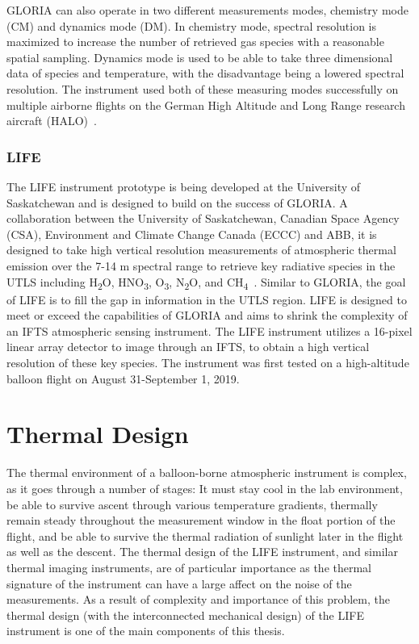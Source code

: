 GLORIA can also operate in two different measurements modes, chemistry mode (CM) and dynamics mode (DM). In chemistry mode, spectral resolution is maximized to increase the number of retrieved gas species with a reasonable spatial sampling. Dynamics mode is used to be able to take three dimensional data of species and temperature, with the disadvantage being a lowered spectral resolution. The instrument used both of these measuring modes successfully on multiple airborne flights on the German High Altitude and Long Range research aircraft (HALO)~\citep{GLORIA_concept}. 

\subsubsection{LIFE} %
The LIFE instrument prototype is being developed at the University of Saskatchewan and is designed to build on the success of GLORIA.  A collaboration between the University of Saskatchewan, Canadian Space Agency (CSA), Environment and Climate Change Canada (ECCC) and ABB, it is designed to take high vertical resolution measurements of atmospheric thermal emission over the 7-14 \textmu m spectral range to retrieve key radiative species in the UTLS including H\textsubscript{2}O, HNO\textsubscript{3}, O\textsubscript{3}, N\textsubscript{2}O, and CH\textsubscript{4}~\citep{ethans_thesis}. Similar to GLORIA, the goal of LIFE is to fill the gap in information in the UTLS region. LIFE is designed to meet or exceed the capabilities of GLORIA and aims to shrink the complexity of an IFTS atmospheric sensing instrument. The LIFE instrument utilizes a 16-pixel linear array detector to image through an IFTS, to obtain a high vertical resolution of these key species. The instrument was first tested on a high-altitude balloon flight on August 31-September 1, 2019.

\section{Thermal Design}
The thermal environment of a balloon-borne atmospheric instrument is complex, as it goes through a number of stages: It must stay cool in the lab environment, be able to survive ascent through various temperature gradients, thermally remain steady throughout the measurement window in the float portion of the flight, and be able to survive the thermal radiation of sunlight later in the flight as well as the descent. The thermal design of the LIFE instrument, and similar thermal imaging instruments, are of particular importance as the thermal signature of the instrument can have a large affect on the noise of the measurements. As a result of complexity and importance of this problem, the thermal design (with the interconnected mechanical design) of the LIFE instrument is one of the main components of this thesis. 

